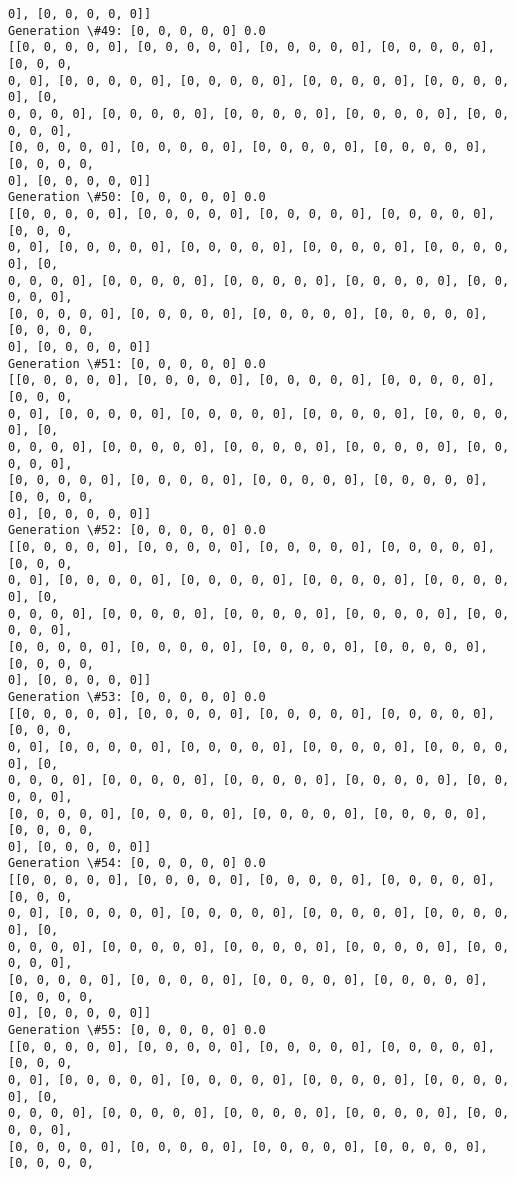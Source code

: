 \documentclass[11pt]{article}
\begin{document}
\begin{Verbatim}[commandchars=\\\{\}]
0], [0, 0, 0, 0, 0]]
Generation \#49: [0, 0, 0, 0, 0] 0.0
[[0, 0, 0, 0, 0], [0, 0, 0, 0, 0], [0, 0, 0, 0, 0], [0, 0, 0, 0, 0], [0, 0, 0,
0, 0], [0, 0, 0, 0, 0], [0, 0, 0, 0, 0], [0, 0, 0, 0, 0], [0, 0, 0, 0, 0], [0,
0, 0, 0, 0], [0, 0, 0, 0, 0], [0, 0, 0, 0, 0], [0, 0, 0, 0, 0], [0, 0, 0, 0, 0],
[0, 0, 0, 0, 0], [0, 0, 0, 0, 0], [0, 0, 0, 0, 0], [0, 0, 0, 0, 0], [0, 0, 0, 0,
0], [0, 0, 0, 0, 0]]
Generation \#50: [0, 0, 0, 0, 0] 0.0
[[0, 0, 0, 0, 0], [0, 0, 0, 0, 0], [0, 0, 0, 0, 0], [0, 0, 0, 0, 0], [0, 0, 0,
0, 0], [0, 0, 0, 0, 0], [0, 0, 0, 0, 0], [0, 0, 0, 0, 0], [0, 0, 0, 0, 0], [0,
0, 0, 0, 0], [0, 0, 0, 0, 0], [0, 0, 0, 0, 0], [0, 0, 0, 0, 0], [0, 0, 0, 0, 0],
[0, 0, 0, 0, 0], [0, 0, 0, 0, 0], [0, 0, 0, 0, 0], [0, 0, 0, 0, 0], [0, 0, 0, 0,
0], [0, 0, 0, 0, 0]]
Generation \#51: [0, 0, 0, 0, 0] 0.0
[[0, 0, 0, 0, 0], [0, 0, 0, 0, 0], [0, 0, 0, 0, 0], [0, 0, 0, 0, 0], [0, 0, 0,
0, 0], [0, 0, 0, 0, 0], [0, 0, 0, 0, 0], [0, 0, 0, 0, 0], [0, 0, 0, 0, 0], [0,
0, 0, 0, 0], [0, 0, 0, 0, 0], [0, 0, 0, 0, 0], [0, 0, 0, 0, 0], [0, 0, 0, 0, 0],
[0, 0, 0, 0, 0], [0, 0, 0, 0, 0], [0, 0, 0, 0, 0], [0, 0, 0, 0, 0], [0, 0, 0, 0,
0], [0, 0, 0, 0, 0]]
Generation \#52: [0, 0, 0, 0, 0] 0.0
[[0, 0, 0, 0, 0], [0, 0, 0, 0, 0], [0, 0, 0, 0, 0], [0, 0, 0, 0, 0], [0, 0, 0,
0, 0], [0, 0, 0, 0, 0], [0, 0, 0, 0, 0], [0, 0, 0, 0, 0], [0, 0, 0, 0, 0], [0,
0, 0, 0, 0], [0, 0, 0, 0, 0], [0, 0, 0, 0, 0], [0, 0, 0, 0, 0], [0, 0, 0, 0, 0],
[0, 0, 0, 0, 0], [0, 0, 0, 0, 0], [0, 0, 0, 0, 0], [0, 0, 0, 0, 0], [0, 0, 0, 0,
0], [0, 0, 0, 0, 0]]
Generation \#53: [0, 0, 0, 0, 0] 0.0
[[0, 0, 0, 0, 0], [0, 0, 0, 0, 0], [0, 0, 0, 0, 0], [0, 0, 0, 0, 0], [0, 0, 0,
0, 0], [0, 0, 0, 0, 0], [0, 0, 0, 0, 0], [0, 0, 0, 0, 0], [0, 0, 0, 0, 0], [0,
0, 0, 0, 0], [0, 0, 0, 0, 0], [0, 0, 0, 0, 0], [0, 0, 0, 0, 0], [0, 0, 0, 0, 0],
[0, 0, 0, 0, 0], [0, 0, 0, 0, 0], [0, 0, 0, 0, 0], [0, 0, 0, 0, 0], [0, 0, 0, 0,
0], [0, 0, 0, 0, 0]]
Generation \#54: [0, 0, 0, 0, 0] 0.0
[[0, 0, 0, 0, 0], [0, 0, 0, 0, 0], [0, 0, 0, 0, 0], [0, 0, 0, 0, 0], [0, 0, 0,
0, 0], [0, 0, 0, 0, 0], [0, 0, 0, 0, 0], [0, 0, 0, 0, 0], [0, 0, 0, 0, 0], [0,
0, 0, 0, 0], [0, 0, 0, 0, 0], [0, 0, 0, 0, 0], [0, 0, 0, 0, 0], [0, 0, 0, 0, 0],
[0, 0, 0, 0, 0], [0, 0, 0, 0, 0], [0, 0, 0, 0, 0], [0, 0, 0, 0, 0], [0, 0, 0, 0,
0], [0, 0, 0, 0, 0]]
Generation \#55: [0, 0, 0, 0, 0] 0.0
[[0, 0, 0, 0, 0], [0, 0, 0, 0, 0], [0, 0, 0, 0, 0], [0, 0, 0, 0, 0], [0, 0, 0,
0, 0], [0, 0, 0, 0, 0], [0, 0, 0, 0, 0], [0, 0, 0, 0, 0], [0, 0, 0, 0, 0], [0,
0, 0, 0, 0], [0, 0, 0, 0, 0], [0, 0, 0, 0, 0], [0, 0, 0, 0, 0], [0, 0, 0, 0, 0],
[0, 0, 0, 0, 0], [0, 0, 0, 0, 0], [0, 0, 0, 0, 0], [0, 0, 0, 0, 0], [0, 0, 0, 0,

\end{Verbatim}
\end{document}
